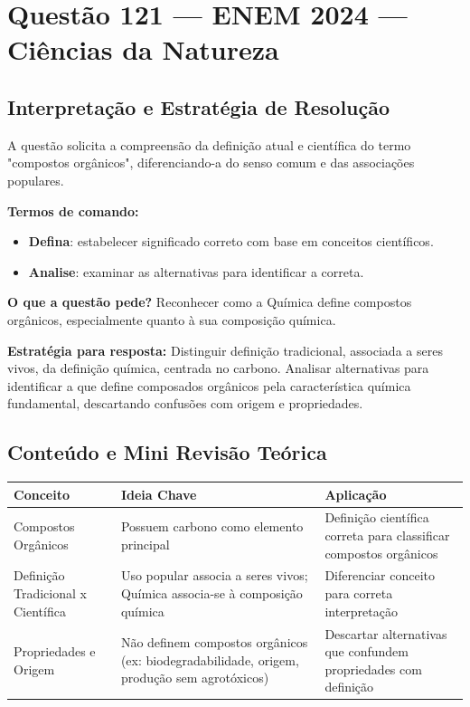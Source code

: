 \documentclass[a4paper,12pt]{article}
\begin{document}
\section*{Questão 121 — ENEM 2024 — Ciências da Natureza}

\subsection*{Interpretação e Estratégia de Resolução}

A questão solicita a compreensão da definição atual e científica do termo "compostos orgânicos", diferenciando-a do senso comum e das associações populares.

\textbf{Termos de comando:}
\begin{itemize}
  \item \textbf{Defina}: estabelecer significado correto com base em conceitos científicos.
  \item \textbf{Analise}: examinar as alternativas para identificar a correta.
\end{itemize}

\textbf{O que a questão pede?}
Reconhecer como a Química define compostos orgânicos, especialmente quanto à sua composição química.

\textbf{Estratégia para resposta:}
Distinguir definição tradicional, associada a seres vivos, da definição química, centrada no carbono. Analisar alternativas para identificar a que define composados orgânicos pela característica química fundamental, descartando confusões com origem e propriedades.


\subsection*{Conteúdo e Mini Revisão Teórica}

\begin{tabular}{|>{\raggedright}p{4.5cm}|p{7cm}|p{5cm}|}
\hline
\textbf{Conceito} & \textbf{Ideia Chave} & \textbf{Aplicação} \\
\hline
Compostos Orgânicos & Possuem carbono como elemento principal & Definição científica correta para classificar compostos orgânicos \\
\hline
Definição Tradicional x Científica & Uso popular associa a seres vivos; Química associa-se à composição química & Diferenciar conceito para correta interpretação \\
\hline
Propriedades e Origem & Não definem compostos orgânicos (ex: biodegradabilidade, origem, produção sem agrotóxicos) & Descartar alternativas que confundem propriedades com definição \\
\hline
\end{tabular}
\end{document}
